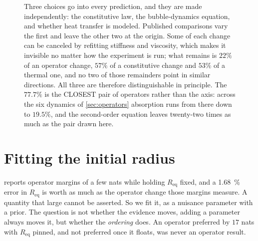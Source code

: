 \documentclass[10pt]{article}
\begin{document}
\begin{figure}[t]
\centering
{}
\caption{Three choices go into every prediction, and they are made independently: the
constitutive law, the bubble-dynamics equation, and whether heat transfer is modeled.
Published comparisons vary the first and leave the other two at the origin. Some of each
change can be canceled by refitting stiffness and viscosity, which makes it invisible no
matter how the experiment is run; what remains is $22\%$ of an operator change, $57\%$ of a
constitutive change and $53\%$ of a thermal one, and no two of those remainders point in
similar directions. All three are therefore distinguishable in principle. The $77.7\%$ is the
CLOSEST pair of operators rather than the axis: across the six dynamics of
\cref{sec:operators} absorption runs from there down to $19.5\%$, and the second-order
equation leaves twenty-two times as much as the pair drawn here.}
\label{fig:modelspace}
\end{figure}

\section{Fitting the initial radius}
\label{sec:reqprior}

 reports operator margins of a few nats while holding $R_{\mathrm{eq}}$
fixed, and a \SI{1.68}{\percent} error in $R_{\mathrm{eq}}$ is worth as much as the operator
change those margins measure. A quantity that large cannot be asserted. So we fit it, as a
nuisance parameter with a prior. The question is not whether the evidence moves, adding a
parameter always moves it, but whether the \emph{ordering} does. An operator preferred by $17$ nats
with $R_{\mathrm{eq}}$ pinned, and not preferred once it floats, was never an operator result.
\end{document}
